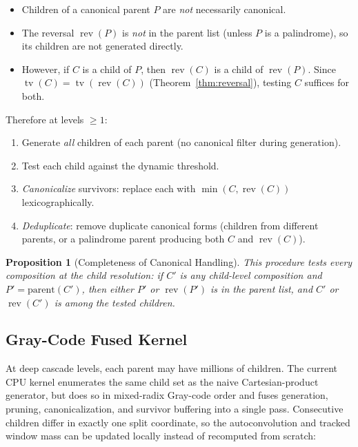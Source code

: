 \documentclass[11pt, letterpaper]{article}
\theoremstyle{paperplain}
\newtheorem{proposition}[theorem]{Proposition}
\theoremstyle{paperdef}
\newcommand{\tv}{\operatorname{tv}}
\newcommand{\rev}{\operatorname{rev}}
\begin{document}
\begin{itemize}
  \item Children of a canonical parent $P$ are \emph{not} necessarily
    canonical.
  \item The reversal $\rev(P)$ is \emph{not} in the parent list
    (unless $P$ is a palindrome), so its children are not generated
    directly.
  \item However, if $C$ is a child of $P$, then $\rev(C)$ is a child
    of $\rev(P)$.  Since $\tv(C) = \tv(\rev(C))$
    (Theorem~\ref{thm:reversal}), testing $C$ suffices for both.
\end{itemize}

Therefore at levels $\ge 1$:
\begin{enumerate}
  \item Generate \emph{all} children of each parent (no canonical
    filter during generation).
  \item Test each child against the dynamic threshold.
  \item \emph{Canonicalize} survivors: replace each with
    $\min(C, \rev(C))$ lexicographically.
  \item \emph{Deduplicate}: remove duplicate canonical forms (children
    from different parents, or a palindrome parent producing both $C$
    and $\rev(C)$).
\end{enumerate}

\begin{proposition}[Completeness of Canonical Handling]
This procedure tests every composition at the child resolution:
if $C'$ is any child-level composition and $P' = \text{parent}(C')$,
then either $P'$ or $\rev(P')$ is in the parent list, and $C'$ or
$\rev(C')$ is among the tested children.
\end{proposition}

\subsection{Gray-Code Fused Kernel}

At deep cascade levels, each parent may have millions of children.
The current CPU kernel enumerates the same child set as the naive
Cartesian-product generator, but does so in mixed-radix Gray-code
order and fuses generation, pruning, canonicalization, and survivor
buffering into a single pass.  Consecutive children differ in exactly
one split coordinate, so the autoconvolution and tracked window mass
can be updated locally instead of recomputed from scratch:
\end{document}
